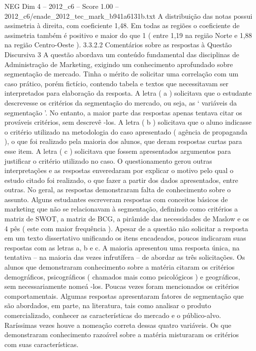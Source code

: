 \begin{textsample}{NEG Dim 4 – 2012\_c6 – Score 1.00 – 2012\_c6/enade\_2012\_tec\_mark\_b941a6131b.txt}
A distribuição das notas possui assimetria à direita, com coeficiente 1,48.
Em todas as regiões o coeficiente de assimetria também é positivo e maior do que 1 ( entre 1,19 na região Norte e 1,88 na região Centro-Oeste ). 3.3.2.2 Comentários sobre as respostas à Questão Discursiva 3 A questão abordava um conteúdo fundamental das disciplinas de Administração de Marketing, exigindo um conhecimento aprofundado sobre segmentação de mercado.
Tinha o mérito de solicitar uma correlação com um caso prático, porém fictício, contendo tabela e textos que necessitavam ser interpretados para elaboração da resposta.
A letra ( a ) solicitava que o estudante descrevesse os critérios da segmentação do mercado, ou seja, as ‘ variáveis da segmentação ’.
No entanto, a maior parte das respostas apenas tentava citar os prováveis critérios, sem descrevê -los.
A letra ( b ) solicitava que o aluno indicasse o critério utilizado na metodologia do caso apresentado ( agência de propaganda ), o que foi realizado pela maioria dos alunos, que deram respostas curtas para esse item.
A letra ( c ) solicitava que fossem apresentados argumentos para justificar o critério utilizado no caso.
O questionamento gerou outras interpretações e as respostas enveredaram por explicar o motivo pelo qual o estudo citado foi realizado, o que fazer a partir dos dados apresentados, entre outras.
No geral, as respostas demonstraram falta de conhecimento sobre o assunto.
Alguns estudantes escreveram respostas com conceitos básicos de marketing que não se relacionavam à segmentação, definindo como critérios a matriz de SWOT, a matriz de BCG, a pirâmide das necessidades de Maslow e os 4 pês ( este com maior frequência ).
Apesar de a questão não solicitar a resposta em um texto dissertativo unificando os itens encadeados, poucos indicaram suas respostas com as letras a, b e c.
A maioria apresentou uma resposta única, na tentativa – na maioria das vezes infrutífera – de abordar as três solicitações.
Os alunos que demonstraram conhecimento sobre a matéria citaram os critérios demográficos, psicográficos ( chamados mais como psicológicos ) e geográficos, sem necessariamente nomeá -los.
Poucas vezes foram mencionados os critérios comportamentais.
Algumas respostas apresentaram fatores de segmentação que são abordados, em parte, na literatura, tais como analisar o produto comercializado, conhecer as características do mercado e o público-alvo.
Raríssimas vezes houve a nomeação correta dessas quatro variáveis.
Os que demonstraram conhecimento razoável sobre a matéria misturaram os critérios com suas características.

\end{textsample}
